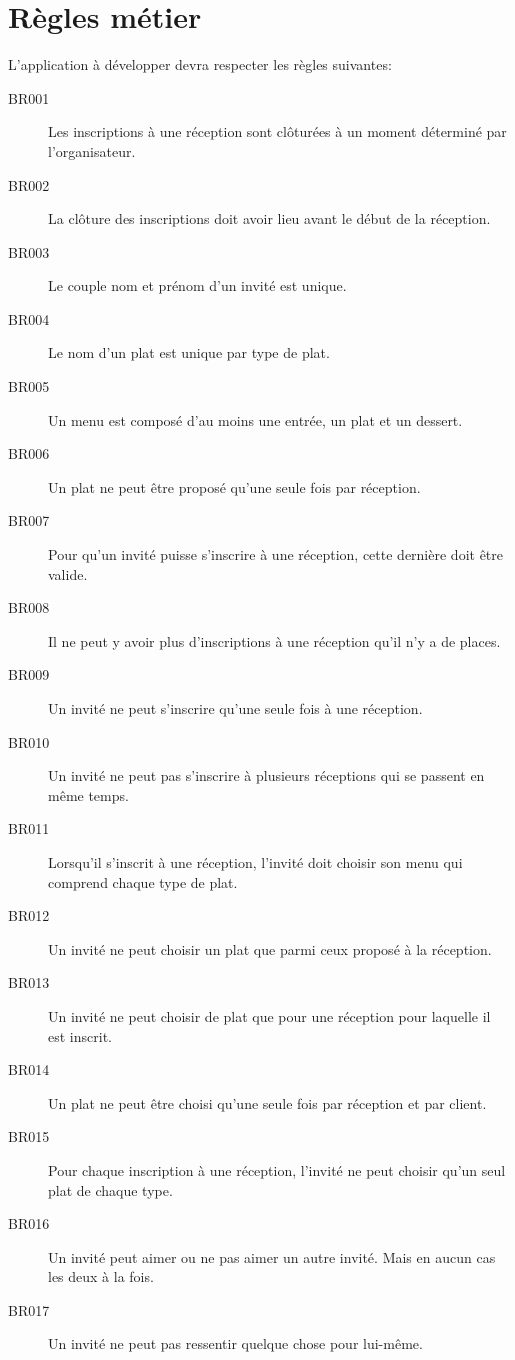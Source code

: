 \chapter{Règles métier}
\label{chapter_business_rules}

L'application à développer devra respecter les règles suivantes:

\begin{description}
  \item[BR001]  Les inscriptions à une réception sont clôturées à un moment déterminé par l'organisateur.
  \item[BR002]  La clôture des inscriptions doit avoir lieu avant le début de la réception.
  \item[BR003]  Le couple nom et prénom d'un invité est unique.
  \item[BR004]  Le nom d'un plat est unique par type de plat.
  \item[BR005]  Un menu est composé d'au moins une entrée, un plat et un dessert.
  \item[BR006]  Un plat ne peut être proposé qu'une seule fois par réception.
  \item[BR007]  Pour qu'un invité puisse s'inscrire à une réception, cette dernière doit être valide.
  \item[BR008]  Il ne peut y avoir plus d'inscriptions à une réception qu'il n'y a de places.
  \item[BR009]  Un invité ne peut s'inscrire qu'une seule fois à une réception.
  \item[BR010]  Un invité ne peut pas s'inscrire à plusieurs réceptions qui se passent en même temps.
  \item[BR011]  Lorsqu'il s'inscrit à une réception, l'invité doit choisir son menu qui comprend chaque type de plat.
  \item[BR012]  Un invité ne peut choisir un plat que parmi ceux proposé à la réception.
  \item[BR013]  Un invité ne peut choisir de plat que pour une réception pour laquelle il est inscrit.
  \item[BR014]  Un plat ne peut être choisi qu'une seule fois par réception et par client.
  \item[BR015]  Pour chaque inscription à une réception, l'invité ne peut choisir qu'un seul plat de chaque type.
  \item[BR016]  Un invité peut aimer ou ne pas aimer un autre invité. Mais en aucun cas les deux à la fois.
  \item[BR017]  Un invité ne peut pas ressentir quelque chose pour lui-même.

\end{description}
